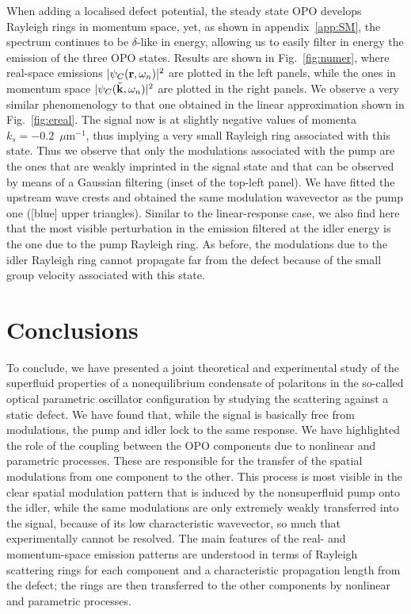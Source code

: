 When adding a localised defect potential, the steady state OPO
develops Rayleigh rings in momentum space, yet, as shown in appendix~\ref{app:SM},
the spectrum continues to be $\delta$-like in energy, allowing us to
easily filter in energy the emission of the three OPO states.
%
Results are shown in Fig.~\ref{fig:numer}, where real-space emissions
$|\psi_C (\mathbf{r},\omega_n)|^2$ are plotted in the left panels, while
the ones in momentum space $|\psi_C (\tilde{\mathbf{k}},\omega_n)|^2$ are
plotted in the right panels. We observe a very similar phenomenology
to that one obtained in the linear approximation shown in
Fig.~\ref{fig:ereal}. The signal now is at slightly negative values of
momenta $k_s=-0.2$~$\mu$m$^{-1}$, thus implying a very small Rayleigh
ring associated with this state. Thus we observe that only the
modulations associated with the pump are the ones that are weakly
imprinted in the signal state and that can be observed by means of a
Gaussian filtering (inset of the top-left panel). We have fitted the
upstream wave crests and obtained the same modulation wavevector as
the pump one ([blue] upper triangles). Similar to the linear-response
case, we also find here that the most visible perturbation in the
emission filtered at the idler energy is the one due to the pump
Rayleigh ring. As before, the modulations due to the idler Rayleigh
ring cannot propagate far from the defect because of the small group
velocity associated with this state.


\section{Conclusions}
%
To conclude, we have presented a joint theoretical and experimental
study of the superfluid properties of a nonequilibrium condensate of
polaritons in the so-called optical parametric oscillator
configuration by studying the scattering against a static defect.
%
We have found that, while the signal is basically free from
modulations, the pump and idler lock to the same response. We have
highlighted the role of the coupling between the OPO components due to
nonlinear and parametric processes. These are responsible for the
transfer of the spatial modulations from one component to the
other. This process is most visible in the clear spatial modulation
pattern that is induced by the nonsuperfluid pump onto the idler,
while the same modulations are only extremely weakly transferred into
the signal, because of its low characteristic wavevector, so much that
experimentally cannot be resolved.
%
The main features of the real- and momentum-space emission patterns
are understood in terms of Rayleigh scattering rings for each
component and a characteristic propagation length from the defect; the
rings are then transferred to the other components by nonlinear and
parametric processes.

